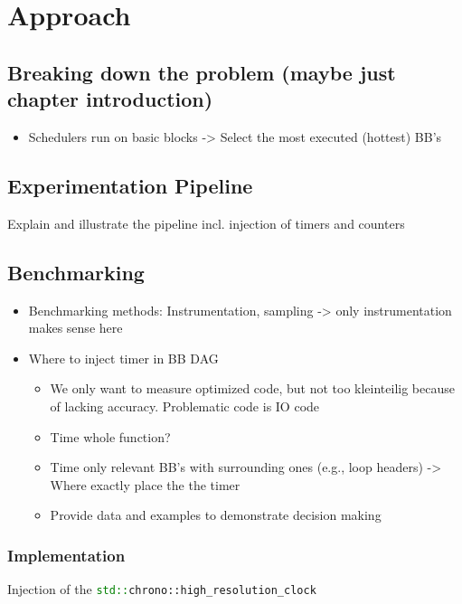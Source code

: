 \chapter{Approach}

\section{Breaking down the problem (maybe just chapter introduction)}
\begin{itemize}
    \item Schedulers run on basic blocks -> Select the most executed (hottest) BB's
\end{itemize}

\section{Experimentation Pipeline}
Explain and illustrate the pipeline incl. injection of timers and counters

\section{Benchmarking}
\begin{itemize}
    \item Benchmarking methods: Instrumentation, sampling -> only instrumentation makes sense here
    \item Where to inject timer in BB DAG
    \begin{itemize}
        \item We only want to measure optimized code, but not too kleinteilig because of lacking accuracy. Problematic code is IO code
        \item Time whole function?
        \item Time only relevant BB's with surrounding ones (e.g., loop headers) -> Where exactly place the the timer
        \item Provide data and examples to demonstrate decision making
    \end{itemize} 
\end{itemize}
\subsection{Implementation}
Injection of the \lstinline[language=C++]|std::chrono::high_resolution_clock|
